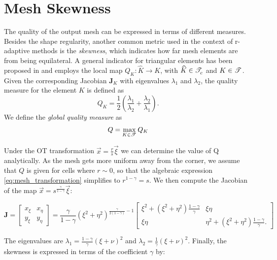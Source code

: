\documentclass[a4paper,11pt]{article}
\begin{document}
{\section{Mesh Skewness}
\label{sec:skewness}
The quality of the output mesh can be expressed in terms of different measures. Besides the shape regularity, another common metric used in the context of r-adaptive methods is the \textit{skewness}, which indicates
how far mesh elements are from being equilateral. A general indicator for triangular elements has been proposed in \cite{BHR:2009} and employs the local map $Q_{K}: \widehat{K}
\rightarrow K$, with $\widehat{K} \in \mathscr T^{}_{c}$ and $K \in
\mathscr T^{}$. Given the corresponding Jacobian $\pmb{J}_{K}$ with eigenvalues
$\lambda_{1}$ and $\lambda_{2}$, the quality measure for the element
$K$ is defined as
\begin{equation}
  Q_{K}
  =
  \frac{1}{2} \left( \frac{\lambda_{1}}{\lambda_{2}}
  +
  \frac{\lambda_{2}}{\lambda_{1}}  \right).
  \label{eq:local skewness}
\end{equation}
We define the \emph{global quality measure} as
\begin{equation}
  Q = \max_{K \in \mathscr T^{}}
  Q_{K}
\end{equation}

Under the OT transformation $\vec x = \frac{r}{s} \vec \xi$ we can determine the value of Q analytically. As the mesh gets more uniform away from the corner, we assume that $Q$ is given for cells where $r \sim 0$, so that the algebraic expression \eqref{eq:mesh_transformation} simplifies to $r^{1-\gamma} = s$. We then compute the Jacobian of the map $\vec x = s^{\frac{\gamma}{1-\gamma}} \vec \xi $:


\begin{equation*} 
 \pmb{J} =  \begin{bmatrix}
x_{\xi} & x_{\eta} \\
y_{\xi} & y_{\eta}  
\end{bmatrix} =  
\frac{\gamma}{1-\gamma} (\xi^{2} + \eta^{2})^{\frac{\gamma}{2(1-\gamma)}-1} \begin{bmatrix}
 \xi^{2} + (\xi^{2} + \eta^{2})\frac{1-\gamma}{\gamma} &  \xi \eta  \\
 \xi \eta &  \eta^{2} + (\xi^{2} + \eta^{2})\frac{1-\gamma}{\gamma}.    
\end{bmatrix}
\end{equation*}

The eigenvalues are $\lambda_{1} = \frac{1-\gamma}{\gamma}(\xi + \nu)^{2}$ and $\lambda_{2} = \frac{1}{\gamma}(\xi + \nu)^{2}$. Finally, the skewness is expressed in terms of the coefficient $\gamma$ by:

}
\end{document}
